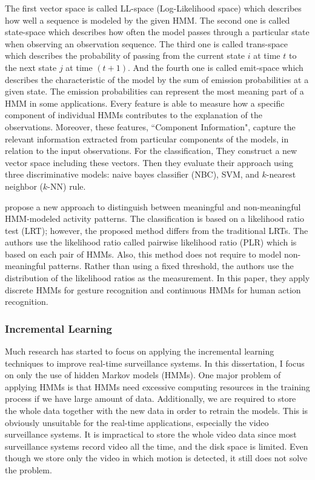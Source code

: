 The first vector space is called LL-space (Log-Likelihood space) which
describes how well a sequence is modeled by the given HMM. The second
one is called state-space which describes how often the model passes
through a particular state when observing an observation sequence. The
third one is called trans-space which describes the probability of
passing from the current state $i$ at time $t$ to the next state $j$
at time $(t+1)$. And the fourth one is called emit-space which
describes the characteristic of the model by the sum of emission
probabilities at a given state. The emission probabilities can
represent the most meaning part of a HMM in some applications. Every
feature is able to measure how a specific component of individual HMMs
contributes to the explanation of the observations. Moreover, these
features, ``Component Information", capture the relevant information
extracted from particular components of the models, in relation to the
input observations. For the classification, They construct a new
vector space including these vectors. Then they evaluate their
approach using three discriminative models: naive bayes classifier
(NBC), SVM, and $k$-nearest neighbor ($k$-NN) rule.

 propose a new approach to
distinguish between meaningful and non-meaningful HMM-modeled activity
patterns. The classification is based on a likelihood ratio test
(LRT); however, the proposed method differs from the traditional
LRTs. The authors use the likelihood ratio called pairwise likelihood
ratio (PLR) which is based on each pair of HMMs. Also, this method
does not require to model non-meaningful patterns. Rather than using a
fixed threshold, the authors use the distribution of the likelihood
ratios as the measurement. In this paper, they apply discrete HMMs for
gesture recognition and continuous HMMs for human action recognition.

\subsubsection{Incremental Learning} 
\label{incremental-learning}

Much research has started to focus on applying the incremental
learning techniques to improve real-time surveillance systems. In this
dissertation, I focus on only the use of hidden Markov models
(HMMs). One major problem of applying HMMs is that HMMs need excessive
computing resources in the training process if we have large amount of
data. Additionally, we are required to store the whole data together
with the new data in order to retrain the models. This is obviously
unsuitable for the real-time applications, especially the video
surveillance systems. It is impractical to store the whole video data
since most surveillance systems record video all the time, and the
disk space is limited. Even though we store only the video in which
motion is detected, it still does not solve the problem.

